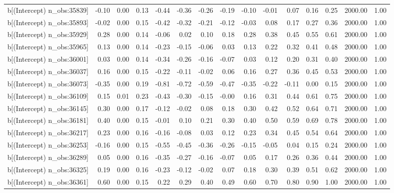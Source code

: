 \begin{table}[ht]
\begin{tabular}{rrrrrrrrrrrrrrr}
  b[(Intercept) n\_obs:35839] & -0.10 & 0.00 & 0.13 & -0.44 & -0.36 & -0.26 & -0.19 & -0.10 & -0.01 & 0.07 & 0.16 & 0.25 & 2000.00 & 1.00 \\ 
  b[(Intercept) n\_obs:35893] & -0.02 & 0.00 & 0.15 & -0.42 & -0.32 & -0.21 & -0.12 & -0.03 & 0.08 & 0.17 & 0.27 & 0.36 & 2000.00 & 1.00 \\ 
  b[(Intercept) n\_obs:35929] & 0.28 & 0.00 & 0.14 & -0.06 & 0.02 & 0.10 & 0.18 & 0.28 & 0.38 & 0.45 & 0.55 & 0.61 & 2000.00 & 1.00 \\ 
  b[(Intercept) n\_obs:35965] & 0.13 & 0.00 & 0.14 & -0.23 & -0.15 & -0.06 & 0.03 & 0.13 & 0.22 & 0.32 & 0.41 & 0.48 & 2000.00 & 1.00 \\ 
  b[(Intercept) n\_obs:36001] & 0.03 & 0.00 & 0.14 & -0.34 & -0.26 & -0.16 & -0.07 & 0.03 & 0.12 & 0.20 & 0.31 & 0.40 & 2000.00 & 1.00 \\ 
  b[(Intercept) n\_obs:36037] & 0.16 & 0.00 & 0.15 & -0.22 & -0.11 & -0.02 & 0.06 & 0.16 & 0.27 & 0.36 & 0.45 & 0.53 & 2000.00 & 1.00 \\ 
  b[(Intercept) n\_obs:36073] & -0.35 & 0.00 & 0.19 & -0.81 & -0.72 & -0.59 & -0.47 & -0.35 & -0.22 & -0.11 & 0.00 & 0.15 & 2000.00 & 1.00 \\ 
  b[(Intercept) n\_obs:36109] & 0.15 & 0.01 & 0.23 & -0.43 & -0.30 & -0.15 & -0.00 & 0.16 & 0.31 & 0.44 & 0.61 & 0.75 & 2000.00 & 1.00 \\ 
  b[(Intercept) n\_obs:36145] & 0.30 & 0.00 & 0.17 & -0.12 & -0.02 & 0.08 & 0.18 & 0.30 & 0.42 & 0.52 & 0.64 & 0.71 & 2000.00 & 1.00 \\ 
  b[(Intercept) n\_obs:36181] & 0.40 & 0.00 & 0.15 & -0.01 & 0.10 & 0.21 & 0.30 & 0.40 & 0.50 & 0.59 & 0.69 & 0.78 & 2000.00 & 1.00 \\ 
  b[(Intercept) n\_obs:36217] & 0.23 & 0.00 & 0.16 & -0.16 & -0.08 & 0.03 & 0.12 & 0.23 & 0.34 & 0.45 & 0.54 & 0.64 & 2000.00 & 1.00 \\ 
  b[(Intercept) n\_obs:36253] & -0.16 & 0.00 & 0.15 & -0.55 & -0.45 & -0.36 & -0.26 & -0.15 & -0.05 & 0.04 & 0.15 & 0.24 & 2000.00 & 1.00 \\ 
  b[(Intercept) n\_obs:36289] & 0.05 & 0.00 & 0.16 & -0.35 & -0.27 & -0.16 & -0.07 & 0.05 & 0.17 & 0.26 & 0.36 & 0.44 & 2000.00 & 1.00 \\ 
  b[(Intercept) n\_obs:36325] & 0.19 & 0.00 & 0.16 & -0.23 & -0.12 & -0.02 & 0.07 & 0.18 & 0.30 & 0.39 & 0.51 & 0.62 & 2000.00 & 1.00 \\ 
  b[(Intercept) n\_obs:36361] & 0.60 & 0.00 & 0.15 & 0.22 & 0.29 & 0.40 & 0.49 & 0.60 & 0.70 & 0.80 & 0.90 & 1.00 & 2000.00 & 1.00 \\ 

\end{tabular}
\end{table}
